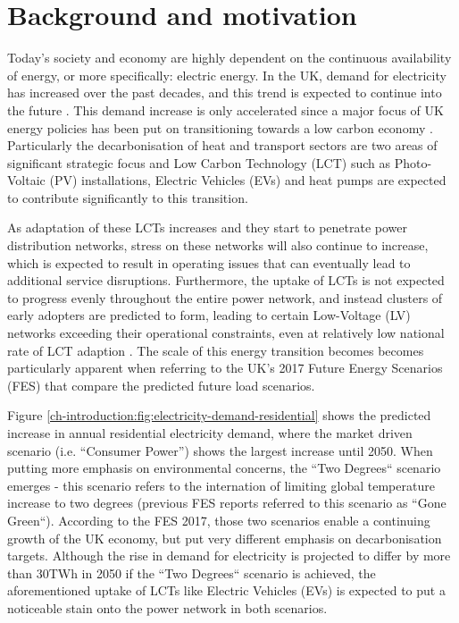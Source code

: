 \section{Background and motivation}
\label{ch-introduction:sec:background}

Today's society and economy are highly dependent on the continuous availability of energy, or more specifically: electric energy.
In the UK, demand for electricity has increased over the past decades, and this trend is expected to continue into the future \cite{HMGovernment2009}.
This demand increase is only accelerated since a major focus of UK energy policies has been put on transitioning towards a low carbon economy \cite{RoyalAcademyofEngineering2010}.
Particularly the decarbonisation of heat and transport sectors are two areas of significant strategic focus and Low Carbon Technology (LCT) such as Photo-Voltaic (PV) installations, Electric Vehicles (EVs) and heat pumps are expected to contribute significantly to this transition.


As adaptation of these LCTs increases and they start to penetrate power distribution networks, stress on these networks will also continue to increase, which is expected to result in operating issues that can eventually lead to additional service disruptions.
Furthermore, the uptake of LCTs is not expected to progress evenly throughout the entire power network, and instead clusters of early adopters are predicted to form, leading to certain Low-Voltage (LV) networks exceeding their operational constraints, even at relatively low national rate of LCT adaption \cite{Poghosyan2014}.
The scale of this energy transition becomes becomes particularly apparent when referring to the UK's 2017 Future Energy Scenarios (FES) that compare the predicted future load scenarios.



Figure \ref{ch-introduction:fig:electricity-demand-residential} shows the predicted increase in annual residential electricity demand, where the market driven scenario (i.e. ``Consumer Power'') shows the largest increase until 2050.
When putting more emphasis on environmental concerns, the ``Two Degrees`` scenario emerges - this scenario refers to the internation of limiting global temperature increase to two degrees (previous FES reports referred to this scenario as ``Gone Green``).
According to the FES 2017, those two scenarios enable a continuing growth of the UK economy, but put very different emphasis on decarbonisation targets.
Although the rise in demand for electricity is projected to differ by more than 30TWh in 2050 if the ``Two Degrees`` scenario is achieved, the aforementioned uptake of LCTs like Electric Vehicles (EVs) is expected to put a noticeable stain onto the power network in both scenarios.


